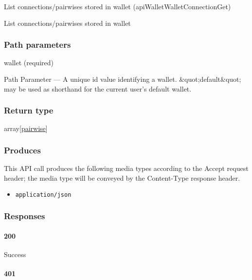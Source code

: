 List connections/pairwises stored in wallet
({apiWalletWalletConnectionGet})

List connections/pairwises stored in wallet

\hypertarget{path-parameters-7}{%
\subsubsection{Path parameters}\label{path-parameters-7}}

wallet (required)

{Path Parameter} --- A unique id value identifying a wallet.
\&quot;default\&quot; may be used as shorthand for the current user's
default wallet.

\hypertarget{return-type-11}{%
\subsubsection{Return type}\label{return-type-11}}

array{[}\protect\hyperlink{pairwise}{pairwise}{]}

\hypertarget{produces-14}{%
\subsubsection{Produces}\label{produces-14}}

This API call produces the following media types according to the
{Accept} request header; the media type will be conveyed by the
{Content-Type} response header.

\begin{itemize}
\tightlist
\item
  \texttt{application/json}
\end{itemize}

\hypertarget{responses-14}{%
\subsubsection{Responses}\label{responses-14}}

\hypertarget{section-47}{%
\paragraph{200}\label{section-47}}

Success

\hypertarget{section-48}{%
\paragraph{401}\label{section-48}}

